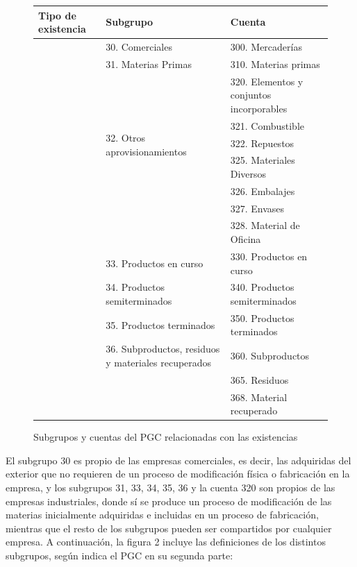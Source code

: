 \documentclass{article}
\begin{document}
\begin{figure}[H]
    \centering
    \begin{tabular}{|p{4cm}|p{4cm}|p{4cm}|}
        \hline
        \textbf{Tipo de existencia} & \textbf{Subgrupo} & \textbf{Cuenta} \\
        \hline
        \multirow{3}{*}{\rotatebox{90}{\parbox{2cm}{Adquiridas del exterior}}} & 30. Comerciales & 300. Mercaderías \\
        \cline{2-3}
        & 31. Materias Primas & 310. Materias primas \\
        \cline{2-3}
        & \multirow{6}{*}{32. Otros aprovisionamientos} & 320. Elementos y conjuntos incorporables \\
        \cline{3-3}
        & & 321. Combustible \\
        \cline{3-3}
        & & 322. Repuestos \\
        \cline{3-3}
        & & 325. Materiales Diversos \\
        \cline{3-3}
        & & 326. Embalajes \\
        \cline{3-3}
        & & 327. Envases \\
        \cline{3-3}
        & & 328. Material de Oficina \\
        \hline
        \multirow{5}{*}{\rotatebox{90}{\parbox{2cm}{Surgidas del proceso productivo}}} & 33. Productos en curso & 330. Productos en curso \\
        \cline{2-3}
        & 34. Productos semiterminados & 340. Productos semiterminados \\
        \cline{2-3}
        & 35. Productos terminados & 350. Productos terminados \\
        \cline{2-3}
        & 36. Subproductos, residuos y materiales recuperados & 360. Subproductos \\    \cline{3-3}
        & & 365. Residuos \\
        \cline{3-3}
        & & 368. Material recuperado \\
        \hline
    \end{tabular}
    \caption{Subgrupos y cuentas del PGC relacionadas con las existencias}
\end{figure}

El subgrupo 30 es propio de las empresas comerciales, es decir, las adquiridas del exterior que no requieren de un proceso de modificación física o fabricación en la empresa, y los subgrupos 31, 33, 34, 35, 36 y la cuenta 320 son propios de las empresas industriales, donde sí se produce un proceso de modificación de las materias inicialmente adquiridas e incluidas en un proceso de fabricación, mientras que el resto de los subgrupos pueden ser compartidos por cualquier empresa. A continuación, la figura 2 incluye las definiciones de los distintos subgrupos, según indica el PGC en su segunda parte:
\end{document}
